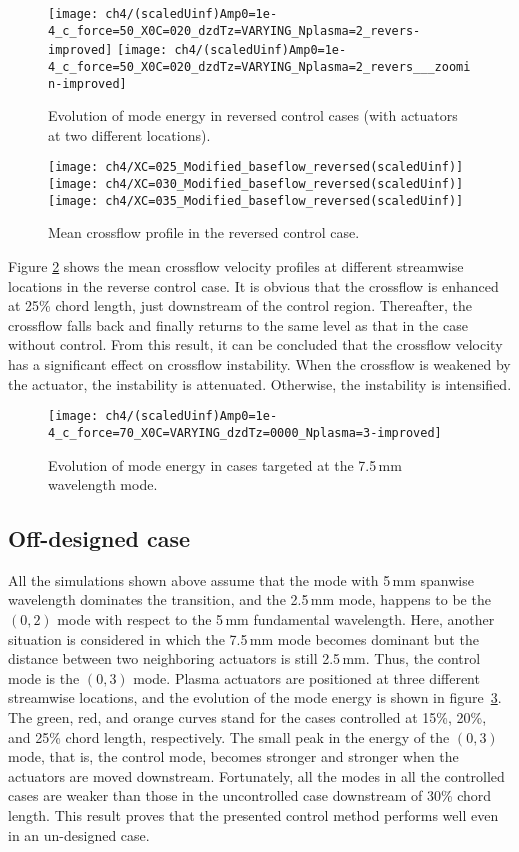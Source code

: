 \begin{figure}
\centering
\texttt{[image: ch4/(scaledUinf)Amp0=1e-4\_c\_force=50\_X0C=020\_dzdTz=VARYING\_Nplasma=2\_revers-improved]}
\texttt{[image: ch4/(scaledUinf)Amp0=1e-4\_c\_force=50\_X0C=020\_dzdTz=VARYING\_Nplasma=2\_revers\_\_\_zoomin-improved]}
\caption{Evolution of mode energy in reversed control cases (with actuators at two different locations).}%
\label{f:model_energy_revers}
\end{figure}

\begin{figure}
\centering
\texttt{[image: ch4/XC=025\_Modified\_baseflow\_reversed(scaledUinf)]}
\texttt{[image: ch4/XC=030\_Modified\_baseflow\_reversed(scaledUinf)]}
\texttt{[image: ch4/XC=035\_Modified\_baseflow\_reversed(scaledUinf)]}
\caption{Mean crossflow profile in the reversed control case.}%
\label{f:inverse_meanflow}
\end{figure}

Figure \ref{f:inverse_meanflow} shows the mean crossflow velocity profiles at different streamwise locations in the reverse control case. It is obvious that the crossflow is enhanced at 25\% chord length, just downstream of the control region. Thereafter, the crossflow falls back and finally returns to the same level as that in the case without control. From this result, it can be concluded that the crossflow velocity has a significant effect on  crossflow instability. When the crossflow is weakened by the actuator, the instability is attenuated. Otherwise, the instability is intensified.
\begin{figure}
\centering
\texttt{[image: ch4/(scaledUinf)Amp0=1e-4\_c\_force=70\_X0C=VARYING\_dzdTz=0000\_Nplasma=3-improved]}
\caption{Evolution of mode energy in cases targeted at the 7.5\,mm wavelength mode.}%
\label{f:7.5mm}
\end{figure}
\subsection{Off-designed case}
All the simulations shown above assume that the mode with 5\,mm spanwise wavelength dominates the transition, and the 2.5\,mm mode, happens to be the $(0,2)$ mode with respect to the 5\,mm fundamental wavelength. Here, another situation is considered in which the 7.5\,mm mode becomes dominant but the distance between two neighboring actuators is still 2.5\,mm. Thus, the control mode is the $(0,3)$ mode. Plasma actuators are positioned at three different streamwise locations, and the evolution of the mode energy is shown in figure~\ref{f:7.5mm}. The green, red, and orange curves stand for the cases controlled at 15\%, 20\%, and 25\% chord length, respectively. The small peak in the energy of the $(0,3)$ mode, that is, the control mode, becomes stronger and stronger when the actuators are moved downstream. Fortunately, all the modes in all the controlled cases are weaker than those in the uncontrolled case downstream of 30\% chord length. This result proves that the presented control method performs well even in an un-designed case.
